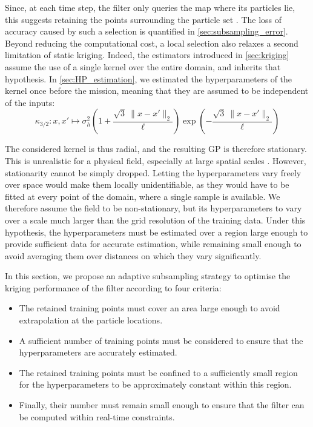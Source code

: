Since, at each time step, the filter only queries the map where its particles lie, this suggests retaining the points surrounding the particle set \cite{bib:screening-effect,bib:kriging-neighbourhood,bib:moving-neighbourhood,bib:local-GP}. The loss of accuracy caused by such a selection is quantified in \cref{sec:subsampling_error}. Beyond reducing the computational cost, a local selection also relaxes a second limitation of static kriging. Indeed, the estimators introduced in \cref{sec:kriging} assume the use of a single kernel over the entire domain, and  inherits that hypothesis. In \cref{sec:HP_estimation}, we estimated the hyperparameters of the kernel once before the mission, meaning that they are assumed to be independent of the inputs:
\begin{equation}
	\kappa_{3/2}:x,x'\mapsto\sigma_h^2\left(1+\frac{\sqrt{3}\:\|x-x'\|_2}{\ell}\right)\exp\left(-\frac{\sqrt{3}\:\|x-x'\|_2}{\ell}\right)
\end{equation}

The considered kernel is thus radial, and the resulting GP is therefore stationary. This is unrealistic for a physical field, especially at large spatial scales \cite{bib:non-stationary-GP}. However, stationarity cannot be simply dropped. Letting the hyperparameters vary freely over space would make them locally unidentifiable, as they would have to be fitted at every point of the domain, where a single sample is available. We therefore assume the field to be non-stationary, but its hyperparameters to vary over a scale much larger than the grid resolution of the training data. Under this hypothesis, the hyperparameters must be estimated over a region large enough to provide sufficient data for accurate estimation, while remaining small enough to avoid averaging them over distances on which they vary significantly.

In this section, we propose an adaptive subsampling strategy to optimise the kriging performance of the filter according to four criteria:
\begin{itemize}
	\item The retained training points must cover an area large enough to avoid extrapolation at the particle locations.
	\item A sufficient number of training points must be considered to ensure that the hyperparameters are accurately estimated.
	\item The retained training points must be confined to a sufficiently small region for the hyperparameters to be approximately constant within this region.
	\item Finally, their number must remain small enough to ensure that the filter can be computed within real-time constraints.
\end{itemize}

